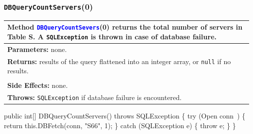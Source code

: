 \documentclass{article}
\def\nwendcode{\endtrivlist \endgroup}      %
\let\nwdocspar=\par
\theoremstyle{definition}                   %
\begin{document}
\subsubsection{{\tt{}\protect{}DBQueryCountServers}(0)}
\begin{tabular}{p{\textwidth}}
\toprule
\rowcolor{TableTitle}
Method \textcolor{blue}{{\tt{}DBQueryCountSevers}}(0) returns the total number
of servers in Table S.
A {\tt{}SQLException} is thrown in case of database failure.\\
\midrule
\textbf{Parameters:} none.\\
\textbf{Returns:} results of the query flattened into an integer array, or
{\tt{}null} if no results.

\begin{tikzpicture}
\small
\matrix[nodes={draw,minimum size=6mm}] {
  \node {$0:\textrm{number of servers in Table S}$};\\
};
\end{tikzpicture}\\
\textbf{Side Effects:} none.\\
\textbf{Throws:} {\tt{}SQLException} if database failure is encountered.\\
\bottomrule
\end{tabular}
\nwenddocs{}\endmoddef{}
public int[] DBQueryCountServers() throws SQLException \{
  try (\LA{}Open \code{}conn\edoc{}~{\nwtagstyle{}}\RA{}) \{
    return this.DBFetch(conn, "S66", 1);
  \} catch (SQLException e) \{
    throw e;
  \}
\}
\eatline
{}\nwendcode{}\nwdocspar
\end{document}
